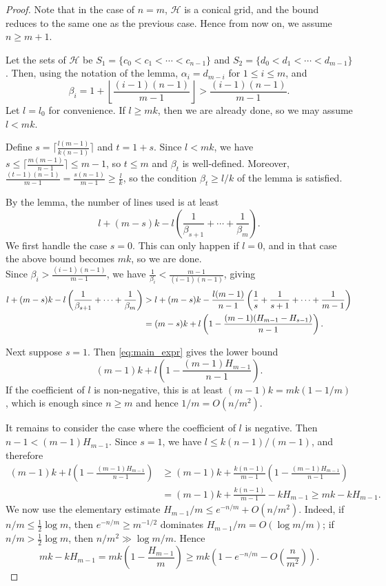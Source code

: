 \documentclass[10pt,a4paper]{amsart}
\def\cH{{\mathcal H}}
\begin{document}
\begin{proof}
    Note that in the case of $n=m$, $\cH$ is a conical grid, and the bound reduces to the same one as the previous case. Hence from now on, we assume $n \geq m+1$. 
    
    Let the sets of $\cH$ be $S_1=\{c_0<c_1<\cdots<c_{n-1}\}$ and $S_2=\{d_0<d_1<\cdots<d_{m-1}\}$. Then, using the notation of the lemma, $\alpha_i=d_{m-i}$ for $1 \leq i \leq m$, and 
    $$\beta_i=1+\left\lfloor\frac{(i-1)(n-1)}{m-1}\right\rfloor > \frac{(i-1)(n-1)}{m-1}.$$ 
    Let $l=l_0$ for convenience. If $l \geq mk$, then we are already done, so we may assume $l < mk$.
 
    Define $s = \lceil \frac{l(m-1)}{k(n-1)} \rceil$ and $t = 1+s$. 
    Since $l < mk$, we have $s \leq \lceil \frac{m(m-1)}{n-1} \rceil \leq m-1$, so $t \leq m$ and $\beta_t$ is well-defined.
    Moreover, $\frac{(t-1)(n-1)}{m-1} = \frac{s(n-1)}{m-1} \geq \frac{l}{k}$, so the condition $\beta_t \geq l/k$ of the lemma is satisfied.
 
    By the lemma, the number of lines used is at least
    $$l+(m-s)k - l\left(\frac{1}{\beta_{s+1}}+\cdots + \frac{1}{\beta_m}\right).$$
    We first handle the case $s=0$. This can only happen if $l=0$, and in that case the above bound becomes $mk$, so we are done. \\
    
    Since $\beta_i > \frac{(i-1)(n-1)}{m-1}$, we have $\frac{1}{\beta_i} < \frac{m-1}{(i-1)(n-1)}$, giving
    \begin{align}
    l+(m-s)k-l\left(\frac{1}{\beta_{s+1}}+\cdots + \frac{1}{\beta_m}\right) & > l+(m-s)k-\frac{l(m-1)}{n-1} \left( \frac{1}{s}+\frac{1}{s+1}+\cdots+\frac{1}{m-1}\right) \notag\\
    &= (m-s)k+l\left(1-\frac{(m-1)(H_{m-1}-H_{s-1})}{n-1}\right). \label{eq:main_expr}
    \end{align}

    Next suppose $s=1$. Then \eqref{eq:main_expr} gives the lower bound
    \[
    (m-1)k+
    l\left(1-\frac{(m-1)H_{m-1}}{n-1}\right).
    \]
    If the coefficient of $l$ is non-negative, this is at least
    $(m-1)k=mk(1-1/m)$, which is enough since $n\geq m$ and hence
    $1/m=O(n/m^2)$.

    It remains to consider the case where the coefficient of $l$ is negative.
    Then $n-1<(m-1)H_{m-1}$. Since $s=1$, we have
    $l\leq k(n-1)/(m-1)$, and therefore
    \begin{align*}
    (m-1)k+
    l\left(1-\frac{(m-1)H_{m-1}}{n-1}\right)
    &\geq
    (m-1)k+
    \frac{k(n-1)}{m-1}
    \left(1-\frac{(m-1)H_{m-1}}{n-1}\right)  \\
    &=
    (m-1)k+\frac{k(n-1)}{m-1}-kH_{m-1}
    \geq
    mk-kH_{m-1}.
    \end{align*}
    We now use the elementary estimate
    $H_{m-1}/m\leq e^{-n/m}+O(n/m^2)$. Indeed, if
    $n/m\leq \frac12\log m$, then $e^{-n/m}\geq m^{-1/2}$ dominates
    $H_{m-1}/m=O(\log m/m)$; if $n/m>\frac12\log m$, then
    $n/m^2\gg \log m/m$. Hence
    \[
    mk-kH_{m-1}
    =
    mk\left(1-\frac{H_{m-1}}{m}\right)
    \geq
    mk\left(1-e^{-n/m}-O\left(\frac{n}{m^2}\right)\right).
    \]
    

\end{proof}
\end{document}
